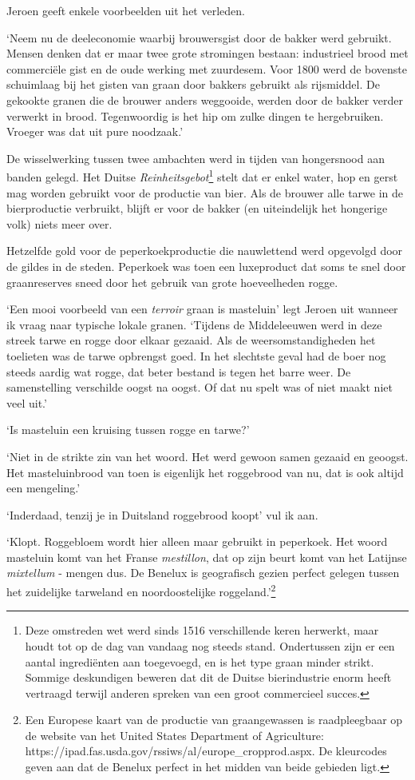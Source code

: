 \documentclass[
  11pt,
  dutch,
]{memoir}
\begin{document}
Jeroen geeft enkele voorbeelden uit het verleden.

`Neem nu de deeleconomie waarbij brouwersgist door de bakker werd
gebruikt. Mensen denken dat er maar twee grote stromingen bestaan:
industrieel brood met commerciële gist en de oude werking met zuurdesem.
Voor 1800 werd de bovenste schuimlaag bij het gisten van graan door
bakkers gebruikt als rijsmiddel. De gekookte granen die de brouwer
anders weggooide, werden door de bakker verder verwerkt in brood.
Tegenwoordig is het hip om zulke dingen te hergebruiken. Vroeger was dat
uit pure noodzaak.'

De wisselwerking tussen twee ambachten werd in tijden van hongersnood
aan banden gelegd. Het Duitse \emph{Reinheitsgebot}\footnote{Deze
  omstreden wet werd sinds 1516 verschillende keren herwerkt, maar houdt
  tot op de dag van vandaag nog steeds stand. Ondertussen zijn er een
  aantal ingrediënten aan toegevoegd, en is het type graan minder
  strikt. Sommige deskundigen beweren dat dit de Duitse bierindustrie
  enorm heeft vertraagd terwijl anderen spreken van een groot
  commercieel succes.} stelt dat er enkel water, hop en gerst mag worden
gebruikt voor de productie van bier. Als de brouwer alle tarwe in de
bierproductie verbruikt, blijft er voor de bakker (en uiteindelijk het
hongerige volk) niets meer over.

Hetzelfde gold voor de peperkoekproductie die nauwlettend werd opgevolgd
door de gildes in de steden. Peperkoek was toen een luxeproduct dat soms
te snel door graanreserves sneed door het gebruik van grote hoeveelheden
rogge.

`Een mooi voorbeeld van een \emph{terroir} graan is masteluin' legt
Jeroen uit wanneer ik vraag naar typische lokale granen. `Tijdens de
Middeleeuwen werd in deze streek tarwe en rogge door elkaar gezaaid. Als
de weersomstandigheden het toelieten was de tarwe opbrengst goed. In het
slechtste geval had de boer nog steeds aardig wat rogge, dat beter
bestand is tegen het barre weer. De samenstelling verschilde oogst na
oogst. Of dat nu spelt was of niet maakt niet veel uit.'

`Is masteluin een kruising tussen rogge en tarwe?'

`Niet in de strikte zin van het woord. Het werd gewoon samen gezaaid en
geoogst. Het masteluinbrood van toen is eigenlijk het roggebrood van nu,
dat is ook altijd een mengeling.'

`Inderdaad, tenzij je in Duitsland roggebrood koopt' vul ik aan.

`Klopt. Roggebloem wordt hier alleen maar gebruikt in peperkoek. Het
woord masteluin komt van het Franse \emph{mestillon}, dat op zijn beurt
komt van het Latijnse \emph{mixtellum} - mengen dus. De Benelux is
geografisch gezien perfect gelegen tussen het zuidelijke tarweland en
noordoostelijke roggeland.'\footnote{Een Europese kaart van de productie
  van graangewassen is raadpleegbaar op de website van het United States
  Department of Agriculture:
  https://ipad.fas.usda.gov/rssiws/al/europe\_cropprod.aspx. De
  kleurcodes geven aan dat de Benelux perfect in het midden van beide
  gebieden ligt.}
\end{document}
